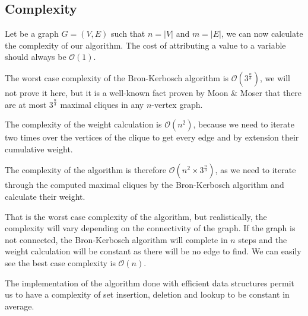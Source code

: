 \subsection{Complexity}

Let be a graph $G=(V,E)$ such that $n=|V|$ and $m=|E|$, we can now calculate the
complexity of our algorithm. The cost of attributing a value to a variable should
always be $\mathcal{O}(1)$. \newline

The worst case complexity of the Bron-Kerbosch algorithm is $\mathcal{O}(3^{\frac{n}{3}})$,
we will not prove it here, but it is a well-known fact proven by Moon \& Moser
\cite{on-cliques-in-graphs} that there are at most $3^{\frac{n}{3}}$ maximal cliques
in any $n$-vertex graph. \newline

The complexity of the weight calculation is $\mathcal{O}(n^2)$, because we need
to iterate two times over the vertices of the clique to get every edge and by
extension their cumulative weight. \newline

The complexity of the algorithm is therefore $\mathcal{O}(n^2\times3^{\frac{n}{3}})$,
as we need to iterate through the computed maximal cliques by the Bron-Kerbosch
algorithm and calculate their weight. \newline

That is the worst case complexity of the algorithm, but realistically, the complexity
will vary depending on the connectivity of the graph. If the graph is not connected,
the Bron-Kerbosch algorithm will complete in $n$ steps and the weight calculation
will be constant as there will be no edge to find. We can easily see the best case
complexity is $\mathcal{O}(n)$. \newline

The implementation of the algorithm done with efficient data structures permit us
to have a complexity of set insertion, deletion and lookup to be constant in average.
